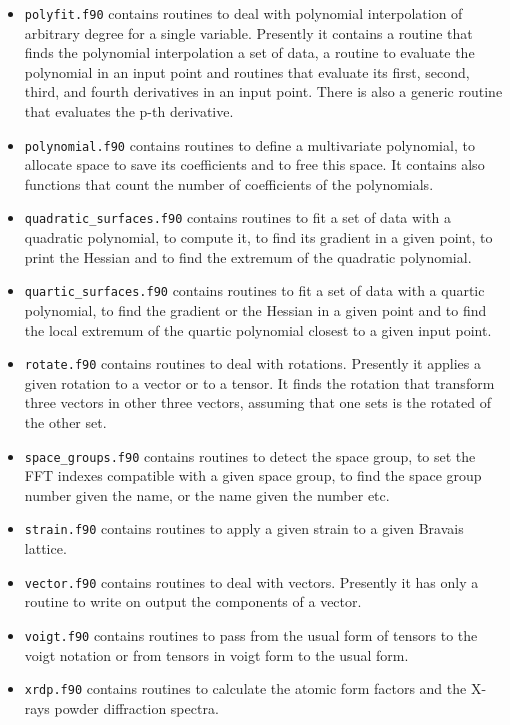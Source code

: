 \documentclass[12pt,a4paper,twoside]{report}
\begin{document}
\begin{itemize}
\item
\texttt{polyfit.f90} contains routines to deal with polynomial
interpolation of arbitrary degree for a single variable. Presently
it contains a routine that finds the polynomial interpolation a set of data,
a routine to evaluate the polynomial in an input point and routines
that evaluate its first, second, third, and fourth derivatives in an 
input point. There is also a generic routine that evaluates the p-th
derivative.

\item
\texttt{polynomial.f90} contains routines to define a multivariate 
polynomial, to allocate space to save its coefficients and to free this
space. It contains also functions that count the number of coefficients 
of the polynomials.

\item
\texttt{quadratic\_surfaces.f90} contains routines to fit a set of data
with a quadratic polynomial, to compute it, to find its gradient 
in a given point, to print the Hessian and to find the extremum of the 
quadratic polynomial. 

\item
\texttt{quartic\_surfaces.f90} contains routines to fit a set of data
with a quartic polynomial, to find the gradient or the Hessian in 
a given point and to find the local extremum of the quartic polynomial
closest to a given input point. 

\item
\texttt{rotate.f90} contains routines to deal with rotations. Presently it
applies a given rotation to a vector or to a tensor.
It finds the rotation that transform three vectors in other three vectors,
assuming that one sets is the rotated of the other set.

\item
\texttt{space\_groups.f90} contains routines to detect the space group,
to set the FFT indexes compatible with a given space group, to find the
space group number given the name, or the name given the number etc.

\item
\texttt{strain.f90} contains routines to apply a given strain to a given
Bravais lattice.

\item
\texttt{vector.f90} contains routines to deal with vectors.
Presently it has only a routine to write on output the components of
a vector.

\item
\texttt{voigt.f90} contains routines to pass from the usual form of tensors
to the voigt notation or from tensors in voigt form to the usual form.

\item
\texttt{xrdp.f90} contains routines to calculate the atomic form factors 
and the X-rays powder diffraction spectra.

\end{itemize}
\end{document}
